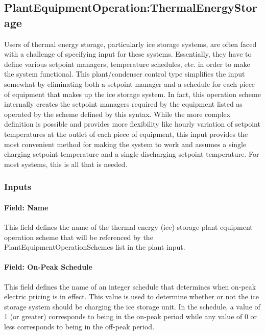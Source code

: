 \subsection{PlantEquipmentOperation:ThermalEnergyStorage}\label{plantequipmentoperationthermalenergystorage}

Users of thermal energy storage, particularly ice storage systems, are often faced with a challenge of specifying input for these systems. Essentially, they have to define various setpoint managers, temperature schedules, etc. in order to make the system functional. This plant/condenser control type simplifies the input somewhat by eliminating both a setpoint manager and a schedule for each piece of equipment that makes up the ice storage system. In fact, this operation scheme internally creates the setpoint managers required by the equipment listed as operated by the scheme defined by this syntax. While the more complex definition is possible and provides more flexibility like hourly variation of setpoint temperatures at the outlet of each piece of equipment, this input provides the most convenient method for making the system to work and assumes a single charging setpoint temperature and a single discharging setpoint temperature. For most systems, this is all that is needed.

\subsubsection{Inputs}\label{inputs-13-009}

\paragraph{Field: Name}\label{field-name-7-013}

This field defines the name of the thermal energy (ice) storage plant equipment operation scheme that will be referenced by the PlantEquipmentOperationSchemes list in the plant input.

\paragraph{Field: On-Peak Schedule}\label{field-on-peak-schedule}

This field defines the name of an integer schedule that determines when on-peak electric pricing is in effect. This value is used to determine whether or not the ice storage system should be charging the ice storage unit. In the schedule, a value of 1 (or greater) corresponds to being in the on-peak period while any value of 0 or less corresponds to being in the off-peak period.

